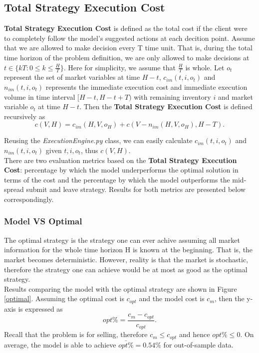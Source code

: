\documentclass[12pt]{extarticle}
\begin{document}
\subsection{Total Strategy Execution Cost}
\textbf{Total Strategy Execution Cost} is defined as the total cost if the client were to
completely follow the model's suggested actions at each decition point. Assume that
we are allowed to make decision every T time unit. That is, during the total time horizon
of the problem definition, we are only allowed to make decisions at $t \in \{ kT: 0 \le k \le \frac{H}{T} \}$.
Here for simplicity, we assume that $\frac{H}{T}$ is whole. Let $o_t$ represent the set
of market variables at time $H - t$, $c_{im}(t, i, o_t)$ and $n_{im}(t, i, o_t)$ represents the immediate execution cost and
immediate execution volume in time interval $[H-t, H-t+T)$ with remaining inventory $i$ and market variable $o_t$ at time $H - t$.
Then the \textbf{Total Strategy Execution Cost} is defined recursively as
$$c(V, H) = c_{im}(H, V, o_H) + c(V - n_{im}(H, V, o_H), H - T).$$

\noindent Reusing the \textit{ExecutionEngine.py} class, we can easily calculate
$c_{im}(t, i, o_t)$ and $n_{im}(t, i, o_t)$ given $t, i, o_t$, thus $c(V, H)$.\\


\noindent There are two evaluation metrics based on the \textbf{Total Strategy Execution Cost}:
percentage by which the model underperforms the optimal solution in terms of the cost and the
percentage by which the model outperforms the mid-spread submit and leave strategy.
Results for both metrics are presented below correspondingly.

\subsubsection{Model VS Optimal}
The optimal strategy is the strategy one can ever achive assuming all market information for the whole
time horizon H is known at the beginning. That is, the market becomes deterministic.
However, reality is that the market is stochastic, therefore the strategy one can
achieve would be at most as good as the optimal strategy.\\


\noindent Results comparing the model with the optimal strategy are shown in Figure \ref{optimal}.
Assuming the optimal cost is $c_{opt}$ and the model cost is $c_{m}$, then the y-axis
is expressed as $$opt\% = \frac{c_{m} - c_{opt}}{c_{opt}}.$$
Recall that the problem is for selling, therefore $c_{m} \le c_{opt}$ and hence $opt\% \le 0$.
On average, the model is able to achieve $\bar{opt\%} = 0.54\%$ for out-of-sample data.
\end{document}
